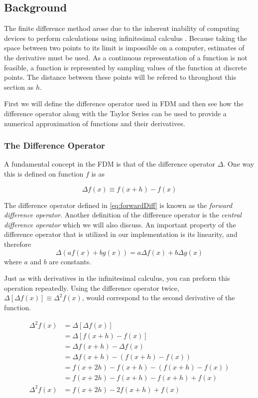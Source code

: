 \documentclass[authoryearcitations]{UoYCSproject}
\begin{document}
\subsection{Background}
The finite difference method arose due to the inherent inability of computing devices to perform
calculations using infinitesimal calculus \cite{Hamming, zhilin}. Because taking the space
between two points to its limit is impossible on a computer, estimates of the derivative must be
used. As a continuous representation of a function is not feasible, a function is represented
by sampling values of the function at discrete points. The distance between these points will
be refered to throughout this section as $h$. 

First we will define the difference operator used in FDM and then see how the difference 
operator along with the Taylor Series can be used to provide a numerical approximation of 
functions and their derivatives. 

\subsubsection{The Difference Operator}
A fundamental concept in the FDM is that of the difference operator $\Delta$. One
way this is defined on function $f$ is as 

\begin{equation}
\label{eq:forwardDiff}
\Delta f(x) \equiv  f(x + h) - f(x)
\end{equation}

The difference operator defined in \ref{eq:forwardDiff} is known as the \emph{forward
difference operator}. Another definition of the difference operator is the \emph{central difference operator} 
which we will also discuss. 
An important property of the difference operator that is utilized in our implementation is its linearity,
 and therefore
$$\Delta (af(x) + bg(x)) = a \Delta f(x) + b\Delta g(x) $$
where $a$ and $b$ are constants. 

Just as with derivatives in the infinitesimal calculus, you can preform this operation repeatedly. Using the difference
operator twice, $\Delta [\Delta f(x) ] \equiv \Delta ^2 f(x) $, would correspond to the second derivative of the function. 

\begin{align}
 \Delta ^2 f(x)&= \Delta [\Delta f(x)]  \nonumber\\
		&= \Delta [f(x + h) - f(x)] \nonumber\\
		&= \Delta f(x + h) - \Delta f(x) \nonumber\\  
		&= \Delta f(x + h) - (f(x + h) - f(x)) \nonumber \\
		&= f(x + 2h) - f(x + h) - (f(x + h) - f(x)) \nonumber \\ 
		&= f(x + 2h) - f(x + h) - f(x + h) + f(x) \nonumber \\
 \Delta ^2 f(x)	&= f(x + 2h) - 2f(x + h) + f(x) \label{eq:deltaSquared}
\end{align}
\end{document}
